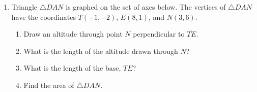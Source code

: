 \documentclass[12pt, twoside]{article}
\begin{document}
\begin{enumerate}
\newpage


\newpage


  \item Triangle $\triangle DAN$ is graphed on the set of axes below. The vertices of $\triangle DAN$ have the coordinates $T(-1,-2)$, $E(8,1)$, and $N(3,6)$.
    \begin{center} %
    \end{center}
    \begin{enumerate}
      \item Draw an altitude through point $N$ perpendicular to $\overline{TE}$.
      \item What is the length of the altitude drawn through $N$? \vspace{1.5cm}
      \item What is the length of the base, $TE$?  \vspace{1.5cm}
      \item Find the area of  $\triangle DAN$.
    \end{enumerate}


  \end{enumerate}

  
\end{document}
